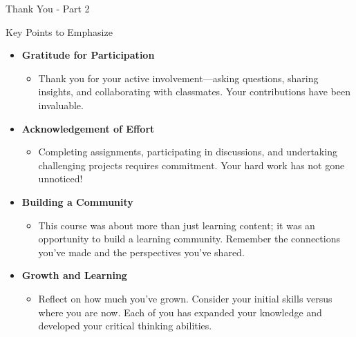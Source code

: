 \documentclass[aspectratio=169]{beamer}
\begin{document}
\begin{frame}[fragile]{Thank You - Part 2}
  \begin{block}{Key Points to Emphasize}
    \begin{itemize}
      \item \textbf{Gratitude for Participation}
        \begin{itemize}
          \item Thank you for your active involvement—asking questions, sharing insights, and collaborating with classmates. Your contributions have been invaluable.
        \end{itemize}
      \item \textbf{Acknowledgement of Effort}
        \begin{itemize}
          \item Completing assignments, participating in discussions, and undertaking challenging projects requires commitment. Your hard work has not gone unnoticed!
        \end{itemize}
      \item \textbf{Building a Community}
        \begin{itemize}
          \item This course was about more than just learning content; it was an opportunity to build a learning community. Remember the connections you’ve made and the perspectives you’ve shared.
        \end{itemize}
      \item \textbf{Growth and Learning}
        \begin{itemize}
          \item Reflect on how much you've grown. Consider your initial skills versus where you are now. Each of you has expanded your knowledge and developed your critical thinking abilities.
        \end{itemize}
    \end{itemize}
  \end{block}
\end{frame}
\end{document}
